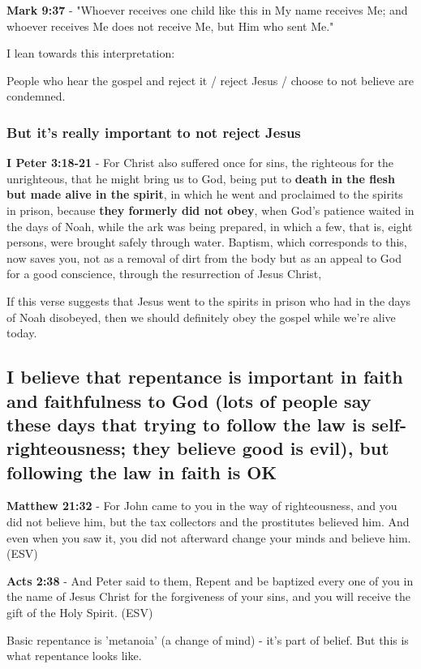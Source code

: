 \documentclass[11pt]{article}
\begin{document}
\textbf{Mark 9:37} - "Whoever receives one child like this in My name receives Me; and whoever receives Me does not receive Me, but Him who sent Me."

I lean towards this interpretation:

People who hear the gospel and reject it / reject Jesus / choose to not believe are condemned.

\subsubsection{But it's \textbf{really} important to not reject Jesus}
\label{sec:org4ca3929}
\textbf{I Peter 3:18-21} - For Christ also suffered once for sins, the righteous for the unrighteous, that he might bring us to God, being put to \textbf{death in the flesh but made alive in the spirit}, in which he went and proclaimed to the spirits in prison, because \textbf{they formerly did not obey}, when God's patience waited in the days of Noah, while the ark was being prepared, in which a few, that is, eight persons, were brought safely through water. Baptism, which corresponds to this, now saves you, not as a removal of dirt from the body but as an appeal to God for a good conscience, through the resurrection of Jesus Christ,

If this verse suggests that Jesus went to the spirits in prison who had in the days of Noah disobeyed, then we should definitely obey the gospel while we're alive today.

\subsection{I believe that repentance is important in faith and faithfulness to God (lots of people say these days that trying to follow the law is self-righteousness; they believe good is evil), but following the law in faith is OK}
\label{sec:org8555eb8}

\textbf{Matthew 21:32} - For John came to you in the way of righteousness, and you did not believe him, but the tax collectors and the prostitutes believed him. And even when you saw it, you did not afterward change your minds and believe him. (ESV)

\textbf{Acts 2:38} - And Peter said to them, Repent and be baptized every one of you in the name of Jesus Christ for the forgiveness of your sins, and you will receive the gift of the Holy Spirit. (ESV)

Basic repentance is 'metanoia' (a change of mind) - it's part of belief.
But this is what repentance looks like.
\end{document}
